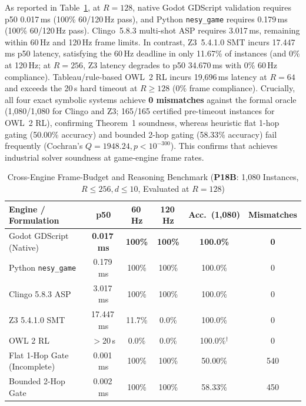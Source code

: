 As reported in Table~\ref{tab:cross-engine}, at $R{=}128$, native Godot GDScript validation requires p50 0.017\,ms (100\% 60/120\,Hz pass), and Python \texttt{nesy\_game} requires 0.179\,ms (100\% 60/120\,Hz pass). Clingo~5.8.3 multi-shot ASP requires 3.017\,ms, remaining within 60\,Hz and 120\,Hz frame limits. In contrast, Z3~5.4.1.0 SMT incurs 17.447\,ms p50 latency, satisfying the 60\,Hz deadline in only 11.67\% of instances (and 0\% at 120\,Hz; at $R{=}256$, Z3 latency degrades to p50 34.670\,ms with 0\% 60\,Hz compliance). Tableau/rule-based OWL~2 RL incurs 19,696\,ms latency at $R{=}64$ and exceeds the 20\,s hard timeout at $R \ge 128$ (0\% frame compliance). Crucially, all four exact symbolic systems achieve \textbf{0 mismatches} against the formal oracle (1,080/1,080 for Clingo and Z3; 165/165 certified pre-timeout instances for OWL~2 RL), confirming Theorem~1 soundness, whereas heuristic flat 1-hop gating (50.00\% accuracy) and bounded 2-hop gating (58.33\% accuracy) fail frequently (Cochran's $Q = 1948.24, p < 10^{-300}$). This confirms that \system{} achieves industrial solver soundness at game-engine frame rates.

\begin{table}[!tbp]
\caption{Cross-Engine Frame-Budget and Reasoning Benchmark (\textbf{P18B}: 1,080 Instances, $R{\le}256, d{\le}10$, Evaluated at $R{=}128$)}
\label{tab:cross-engine}
\centering
\scriptsize
\setlength{\tabcolsep}{2.0pt}
\begin{tabularx}{\columnwidth}{@{}>{\raggedright\arraybackslash}Xccccc@{}}
\toprule
\textbf{Engine / Formulation} & \textbf{p50} & \textbf{60\,Hz} & \textbf{120\,Hz} & \textbf{Acc.\ (1,080)} & \textbf{Mismatches} \\
\midrule
Godot GDScript (Native)                & \textbf{0.017\,ms} & \textbf{100\%} & \textbf{100\%} & \textbf{100.0\%} & \textbf{0} \\
Python \texttt{nesy\_game}             & 0.179\,ms & 100\% & 100\% & 100.0\% & 0 \\
Clingo 5.8.3 ASP~\cite{gebser2019clingo}  & 3.017\,ms & 100\% & 100\% & 100.0\% & 0 \\
Z3 5.4.1.0 SMT~\cite{demoura2008z3}       & 17.447\,ms & 11.7\% & 0.0\% & 100.0\% & 0 \\
OWL 2 RL~\cite{motik2012owl2profiles}     & $>$20\,s  & 0.0\% & 0.0\% & 100.0\%$^\dagger$ & 0 \\
\midrule
Flat 1-Hop Gate (Incomplete)           & 0.001\,ms & 100\% & 100\% & 50.00\% & 540 \\
Bounded 2-Hop Gate                     & 0.002\,ms & 100\% & 100\% & 58.33\% & 450 \\
\bottomrule
\end{tabularx}
\end{table}

